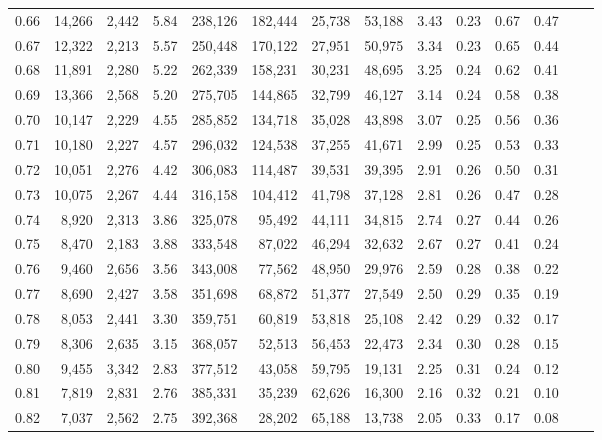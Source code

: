 \begin{tabular}{rrrrrrrrrrrrrr}
0.66 &  14,266 &  2,442 &    5.84 &  238,126 &  182,444 &  25,738 &  53,188 &  3.43 &  0.23 &  0.67 &      0.47 \\
0.67 &  12,322 &  2,213 &    5.57 &  250,448 &  170,122 &  27,951 &  50,975 &  3.34 &  0.23 &  0.65 &      0.44 \\
0.68 &  11,891 &  2,280 &    5.22 &  262,339 &  158,231 &  30,231 &  48,695 &  3.25 &  0.24 &  0.62 &      0.41 \\
0.69 &  13,366 &  2,568 &    5.20 &  275,705 &  144,865 &  32,799 &  46,127 &  3.14 &  0.24 &  0.58 &      0.38 \\
0.70 &  10,147 &  2,229 &    4.55 &  285,852 &  134,718 &  35,028 &  43,898 &  3.07 &  0.25 &  0.56 &      0.36 \\
0.71 &  10,180 &  2,227 &    4.57 &  296,032 &  124,538 &  37,255 &  41,671 &  2.99 &  0.25 &  0.53 &      0.33 \\
0.72 &  10,051 &  2,276 &    4.42 &  306,083 &  114,487 &  39,531 &  39,395 &  2.91 &  0.26 &  0.50 &      0.31 \\
0.73 &  10,075 &  2,267 &    4.44 &  316,158 &  104,412 &  41,798 &  37,128 &  2.81 &  0.26 &  0.47 &      0.28 \\
0.74 &   8,920 &  2,313 &    3.86 &  325,078 &   95,492 &  44,111 &  34,815 &  2.74 &  0.27 &  0.44 &      0.26 \\
0.75 &   8,470 &  2,183 &    3.88 &  333,548 &   87,022 &  46,294 &  32,632 &  2.67 &  0.27 &  0.41 &      0.24 \\
0.76 &   9,460 &  2,656 &    3.56 &  343,008 &   77,562 &  48,950 &  29,976 &  2.59 &  0.28 &  0.38 &      0.22 \\
0.77 &   8,690 &  2,427 &    3.58 &  351,698 &   68,872 &  51,377 &  27,549 &  2.50 &  0.29 &  0.35 &      0.19 \\
0.78 &   8,053 &  2,441 &    3.30 &  359,751 &   60,819 &  53,818 &  25,108 &  2.42 &  0.29 &  0.32 &      0.17 \\
0.79 &   8,306 &  2,635 &    3.15 &  368,057 &   52,513 &  56,453 &  22,473 &  2.34 &  0.30 &  0.28 &      0.15 \\
0.80 &   9,455 &  3,342 &    2.83 &  377,512 &   43,058 &  59,795 &  19,131 &  2.25 &  0.31 &  0.24 &      0.12 \\
0.81 &   7,819 &  2,831 &    2.76 &  385,331 &   35,239 &  62,626 &  16,300 &  2.16 &  0.32 &  0.21 &      0.10 \\
0.82 &   7,037 &  2,562 &    2.75 &  392,368 &   28,202 &  65,188 &  13,738 &  2.05 &  0.33 &  0.17 &      0.08 \\

\end{tabular}
